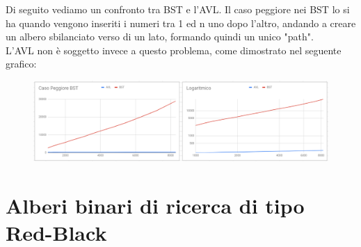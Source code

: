\documentclass[a4paper]{article}
\begin{document}
			Di seguito vediamo un confronto tra BST e l'AVL. Il caso peggiore nei BST lo si ha quando vengono inseriti i numeri tra 1 ed n uno dopo l'altro, andando a creare un albero sbilanciato verso di un lato, formando quindi un unico "path". \\
			L'AVL non è soggetto invece a questo problema, come dimostrato nel seguente grafico:
			\begin{figure}[ht]
				\includegraphics[width=12cm]{CasoPeggioreBST}
			\end{figure}
			
		\newpage
		
		\section{Alberi binari di ricerca di tipo Red-Black}
\end{document}
